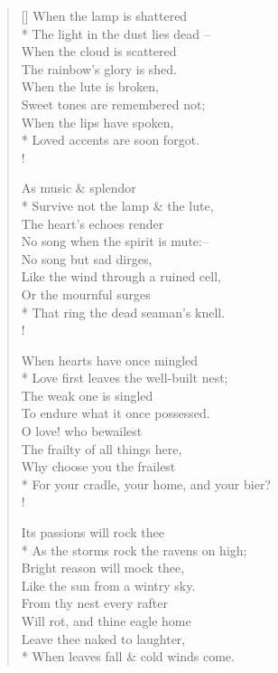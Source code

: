 \documentclass[MAIN]{subfiles}
\begin{document}
\settowidth{\versewidth}{When the lamp is shattered}
\begin{verse}[\versewidth]
\vin When the lamp is shattered\\*
The light in the dust lies dead --\\
\vin When the cloud is scattered\\
The rainbow's glory is shed.\\
\vin When the lute is broken,\\
Sweet tones are remembered not;\\
\vin When the lips have spoken,\\*
Loved accents are soon forgot.\\!

\vin As music \& splendor\\*
Survive not the lamp \& the lute,\\
\vin The heart's echoes render\\
No song when the spirit is mute:--\\
\vin No song but sad dirges,\\
Like the wind through a ruined cell,\\
\vin Or the mournful surges\\*
That ring the dead seaman's knell.\\!

\vin When hearts have once mingled\\*
Love first leaves the well-built nest;\\
\vin The weak one is singled\\
To endure what it once possessed.\\
\vin O love! who bewailest\\
The frailty of all things here,\\
\vin Why choose you the frailest\\*
For your cradle, your home, and your bier?\\!

\vin Its passions will rock thee\\*
As the storms rock the ravens on high;\\
\vin Bright reason will mock thee,\\
Like the sun from a wintry sky.\\
\vin From thy nest every rafter\\
Will rot, and thine eagle home\\
\vin Leave thee naked to laughter,\\*
When leaves fall \& cold winds come.
\end{verse}
\end{document}
